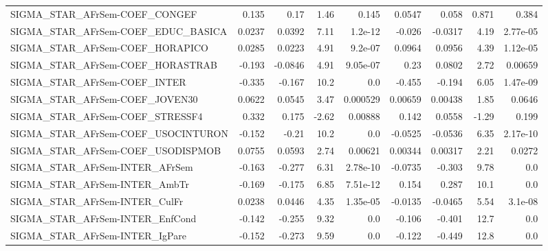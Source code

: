 \begin{tabular}{lrrrrrrrr}
SIGMA\_STAR\_AFrSem-COEF\_CONGEF         &       0.135 &         0.17 &     1.46 &    0.145 &     0.0547 &       0.058 &        0.871 &         0.384 \\
SIGMA\_STAR\_AFrSem-COEF\_EDUC\_BASICA    &      0.0237 &       0.0392 &     7.11 &  1.2e-12 &     -0.026 &     -0.0317 &         4.19 &      2.77e-05 \\
SIGMA\_STAR\_AFrSem-COEF\_HORAPICO       &      0.0285 &       0.0223 &     4.91 &  9.2e-07 &     0.0964 &      0.0956 &         4.39 &      1.12e-05 \\
SIGMA\_STAR\_AFrSem-COEF\_HORASTRAB      &      -0.193 &      -0.0846 &     4.91 & 9.05e-07 &       0.23 &      0.0802 &         2.72 &       0.00659 \\
SIGMA\_STAR\_AFrSem-COEF\_INTER          &      -0.335 &       -0.167 &     10.2 &      0.0 &     -0.455 &      -0.194 &         6.05 &      1.47e-09 \\
SIGMA\_STAR\_AFrSem-COEF\_JOVEN30        &      0.0622 &       0.0545 &     3.47 & 0.000529 &    0.00659 &     0.00438 &         1.85 &        0.0646 \\
SIGMA\_STAR\_AFrSem-COEF\_STRESSF4       &       0.332 &        0.175 &    -2.62 &  0.00888 &      0.142 &      0.0558 &        -1.29 &         0.199 \\
SIGMA\_STAR\_AFrSem-COEF\_USOCINTURON    &      -0.152 &        -0.21 &     10.2 &      0.0 &    -0.0525 &     -0.0536 &         6.35 &      2.17e-10 \\
SIGMA\_STAR\_AFrSem-COEF\_USODISPMOB     &      0.0755 &       0.0593 &     2.74 &  0.00621 &    0.00344 &     0.00317 &         2.21 &        0.0272 \\
SIGMA\_STAR\_AFrSem-INTER\_AFrSem        &      -0.163 &       -0.277 &     6.31 & 2.78e-10 &    -0.0735 &      -0.303 &         9.78 &           0.0 \\
SIGMA\_STAR\_AFrSem-INTER\_AmbTr         &      -0.169 &       -0.175 &     6.85 & 7.51e-12 &      0.154 &       0.287 &         10.1 &           0.0 \\
SIGMA\_STAR\_AFrSem-INTER\_CulFr         &      0.0238 &       0.0446 &     4.35 & 1.35e-05 &    -0.0135 &     -0.0465 &         5.54 &       3.1e-08 \\
SIGMA\_STAR\_AFrSem-INTER\_EnfCond       &      -0.142 &       -0.255 &     9.32 &      0.0 &     -0.106 &      -0.401 &         12.7 &           0.0 \\
SIGMA\_STAR\_AFrSem-INTER\_IgPare        &      -0.152 &       -0.273 &     9.59 &      0.0 &     -0.122 &      -0.449 &         12.8 &           0.0 \\

\end{tabular}
